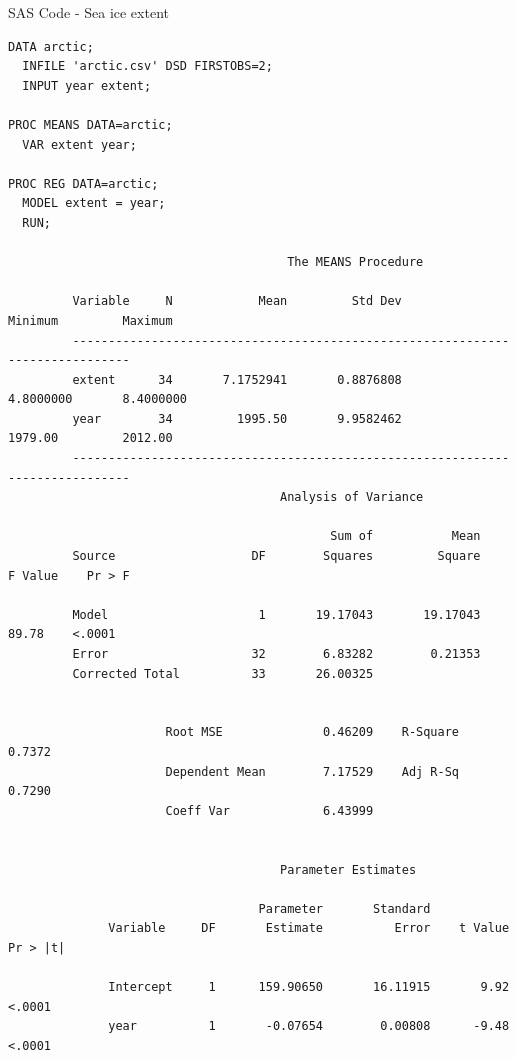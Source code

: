 \documentclass[10pt,draft]{article}
\begin{document}
\newpage
SAS Code - Sea ice extent
\begin{verbatim}
DATA arctic;
  INFILE 'arctic.csv' DSD FIRSTOBS=2;
  INPUT year extent;

PROC MEANS DATA=arctic;
  VAR extent year;

PROC REG DATA=arctic;
  MODEL extent = year;
  RUN;

                                       The MEANS Procedure

         Variable     N            Mean         Std Dev         Minimum         Maximum
         ------------------------------------------------------------------------------
         extent      34       7.1752941       0.8876808       4.8000000       8.4000000
         year        34         1995.50       9.9582462         1979.00         2012.00
         ------------------------------------------------------------------------------
                                      Analysis of Variance

                                             Sum of           Mean
         Source                   DF        Squares         Square    F Value    Pr > F

         Model                     1       19.17043       19.17043      89.78    <.0001
         Error                    32        6.83282        0.21353
         Corrected Total          33       26.00325


                      Root MSE              0.46209    R-Square     0.7372
                      Dependent Mean        7.17529    Adj R-Sq     0.7290
                      Coeff Var             6.43999


                                      Parameter Estimates

                                   Parameter       Standard
              Variable     DF       Estimate          Error    t Value    Pr > |t|

              Intercept     1      159.90650       16.11915       9.92      <.0001
              year          1       -0.07654        0.00808      -9.48      <.0001
\end{verbatim}
\end{document}
